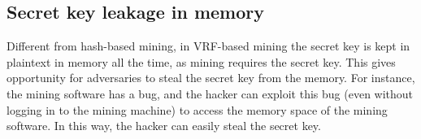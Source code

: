 



\subsection{Secret key leakage in memory}

Different from hash-based mining, in VRF-based mining the secret key is kept in plaintext in memory all the time, as mining requires the secret key. This gives opportunity for adversaries to steal the secret key from the memory. For instance, the mining software has a bug, and the hacker can exploit this bug (even without logging in to the mining machine) to access the memory space of the mining software. In this way, the hacker can easily steal the secret key.

